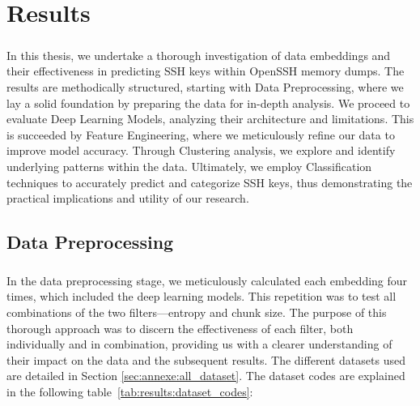 \chapter{Results}\label{chap:results}

\paragraph{}In this thesis, we undertake a thorough investigation of data embeddings and their effectiveness in predicting SSH keys within OpenSSH memory dumps. The results are methodically structured, starting with Data Preprocessing, where we lay a solid foundation by preparing the data for in-depth analysis. We proceed to evaluate Deep Learning Models, analyzing their architecture and limitations. This is succeeded by Feature Engineering, where we meticulously refine our data to improve model accuracy. Through Clustering analysis, we explore and identify underlying patterns within the data. Ultimately, we employ Classification techniques to accurately predict and categorize SSH keys, thus demonstrating the practical implications and utility of our research. 
    

\section{Data Preprocessing}

\paragraph{}In the data preprocessing stage, we meticulously calculated each embedding four times, which included the deep learning models. This repetition was to test all combinations of the two filters—entropy and chunk size. The purpose of this thorough approach was to discern the effectiveness of each filter, both individually and in combination, providing us with a clearer understanding of their impact on the data and the subsequent results. The different datasets used are detailed in Section \ref{sec:annexe:all_dataset}. The dataset codes are explained in the following table~\ref{tab:results:dataset_codes}:

